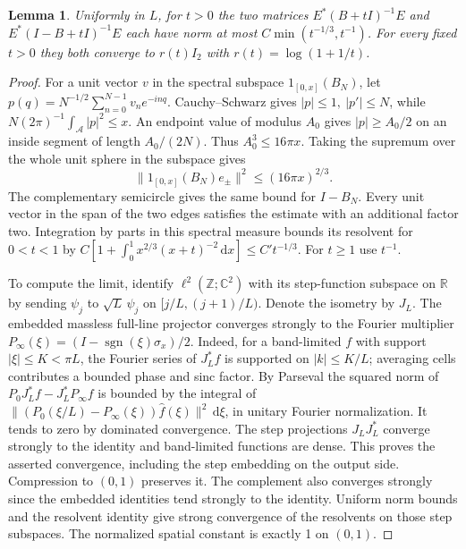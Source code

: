 \documentclass[11pt,letterpaper]{article}
\newtheorem{lemma}[theorem]{Lemma}
\newcommand{\dd}{\,\mathrm d}
\newcommand{\arc}{\mathcal A}
\begin{document}
\begin{lemma}\label{lem:edge}
Uniformly in \(L\), for \(t>0\) the two matrices \(E^*(B+tI)^{-1}E\) and \(E^*(I-B+tI)^{-1}E\) each have norm at most \(C\min(t^{-1/3},t^{-1})\). For every fixed \(t>0\) they both converge to \(r(t)I_2\) with \(r(t)=\log(1+1/t)\).
\end{lemma}
\begin{proof}
For a unit vector \(v\) in the spectral subspace \(1_{[0,x]}(B_N)\), let \(p(q)=N^{-1/2}\sum_{n=0}^{N-1}v_n e^{-inq}\). Cauchy--Schwarz gives \(|p|\le1,\ |p'|\le N\), while \(N(2\pi)^{-1}\int_\arc|p|^2\le x\). An endpoint value of modulus \(A_0\) gives \(|p|\ge A_0/2\) on an inside segment of length \(A_0/(2N)\). Thus \(A_0^3\le16\pi x\). Taking the supremum over the whole unit sphere in the subspace gives
\[
 \|1_{[0,x]}(B_N)e_\pm\|^2\le(16\pi x)^{2/3}.
\]
The complementary semicircle gives the same bound for \(I-B_N\). Every unit vector in the span of the two edges satisfies the estimate with an additional factor two. Integration by parts in this spectral measure bounds its resolvent for \(0<t<1\) by \(C[1+\int_0^1 x^{2/3}(x+t)^{-2}\dd x]\le C't^{-1/3}\). For \(t\ge1\) use \(t^{-1}\).

To compute the limit, identify \(\ell^2(\mathbb Z;\mathbb C^2)\) with its step-function subspace on \(\mathbb R\) by sending \(\psi_j\) to \(\sqrt L\,\psi_j\) on \([j/L,(j+1)/L)\). Denote the isometry by \(J_L\). The embedded massless full-line projector converges strongly to the Fourier multiplier \(P_\infty(\xi)=(I-\operatorname{sgn}(\xi)\sigma_x)/2\). Indeed, for a band-limited \(f\) with support \(|\xi|\le K<\pi L\), the Fourier series of \(J_L^*f\) is supported on \(|k|\le K/L\); averaging cells contributes a bounded phase and sinc factor. By Parseval the squared norm of \(P_0 J_L^*f-J_L^*P_\infty f\) is bounded by the integral of \(\|(P_0(\xi/L)-P_\infty(\xi))\widehat f(\xi)\|^2\dd\xi\), in unitary Fourier normalization. It tends to zero by dominated convergence. The step projections \(J_LJ_L^*\) converge strongly to the identity and band-limited functions are dense. This proves the asserted convergence, including the step embedding on the output side. Compression to \((0,1)\) preserves it. The complement also converges strongly since the embedded identities tend strongly to the identity. Uniform norm bounds and the resolvent identity give strong convergence of the resolvents on those step subspaces. The normalized spatial constant is exactly 1 on \((0,1)\).


\end{proof}
\end{document}
